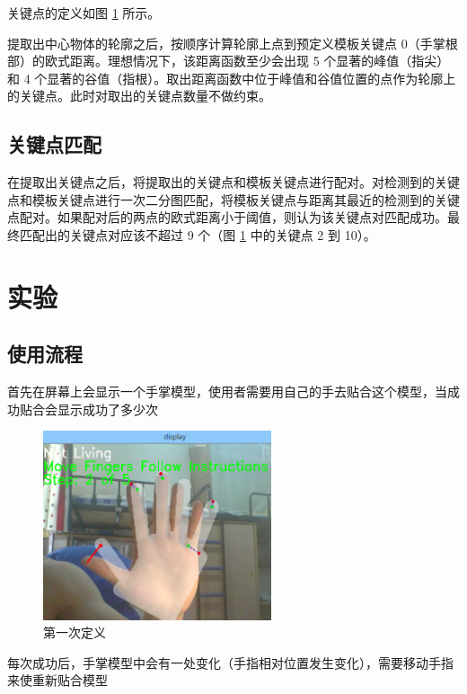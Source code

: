 \documentclass[UTF8, a4paper, fontset=none]{article}
\begin{document}
关键点的定义如图 \ref{hand} 所示。

提取出中心物体的轮廓之后，按顺序计算轮廓上点到预定义模板关键点 0（手掌根部）的欧式距离。理想情况下，该距离函数至少会出现 5 个显著的峰值（指尖）和 4 个显著的谷值（指根）。取出距离函数中位于峰值和谷值位置的点作为轮廓上的关键点。此时对取出的关键点数量不做约束。

\subsection{关键点匹配}

在提取出关键点之后，将提取出的关键点和模板关键点进行配对。对检测到的关键点和模板关键点进行一次二分图匹配，将模板关键点与距离其最近的检测到的关键点配对。如果配对后的两点的欧式距离小于阈值，则认为该关键点对匹配成功。最终匹配出的关键点对应该不超过 9 个（图 \ref{hand} 中的关键点 2 到 10）。

\section{实验}

    \subsection{使用流程}
	
	首先在屏幕上会显示一个手掌模型，使用者需要用自己的手去贴合这个模型，当成功贴合会显示成功了多少次
	
	\begin{figure}
    \centering
    \includegraphics[width=0.6\textwidth]{./test1.png}
    \caption{第一次定义}
    \label{hand}
	\end{figure}
	
	每次成功后，手掌模型中会有一处变化（手指相对位置发生变化），需要移动手指来使重新贴合模型
	
\end{document}
